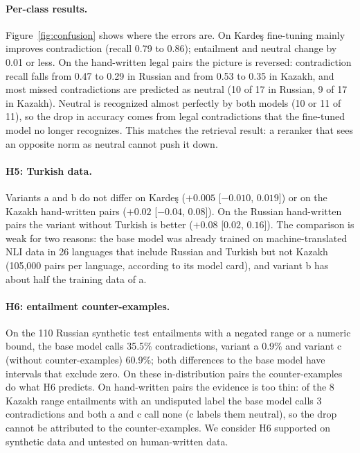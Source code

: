 \documentclass[11pt]{article}
\begin{document}
\paragraph{Per-class results.} Figure~\ref{fig:confusion} shows where the errors are. On Karde\c{s} fine-tuning
mainly improves contradiction (recall 0.79 to 0.86); entailment and neutral change by 0.01 or less. On the
hand-written legal pairs the picture is reversed: contradiction recall falls from 0.47 to 0.29 in Russian and
from 0.53 to 0.35 in Kazakh, and most missed contradictions are predicted as neutral (10 of 17 in Russian, 9 of 17
in Kazakh). Neutral is recognized almost perfectly by both models (10 or 11 of 11), so the drop in accuracy comes
from legal contradictions that the fine-tuned model no longer recognizes. This matches the retrieval result: a
reranker that sees an opposite norm as neutral cannot push it down.

\paragraph{H5: Turkish data.} Variants a and b do not differ on Karde\c{s} ($+0.005$ [$-0.010$, $0.019$]) or
on the Kazakh hand-written pairs ($+0.02$ [$-0.04$, $0.08$]). On the Russian hand-written pairs the variant
without Turkish is better ($+0.08$ [$0.02$, $0.16$]). The comparison is weak for two reasons: the base
model was already trained on machine-translated NLI data in 26 languages that include Russian and Turkish but
not Kazakh (105,000 pairs per language, according to its model card), and variant b has about half the
training data of a.

\paragraph{H6: entailment counter-examples.} On the 110 Russian synthetic test entailments with a negated range
or a numeric bound, the base model calls 35.5\% contradictions, variant a 0.9\% and variant c (without
counter-examples) 60.9\%; both differences to the base model have intervals that exclude zero. On these
in-distribution pairs the counter-examples do what H6 predicts. On hand-written pairs the evidence is too thin:
of the 8 Kazakh range entailments with an undisputed label the base model calls 3 contradictions and both a and
c call none (c labels them neutral), so the drop cannot be attributed to the counter-examples. We consider H6
supported on synthetic data and untested on human-written data.
\end{document}
